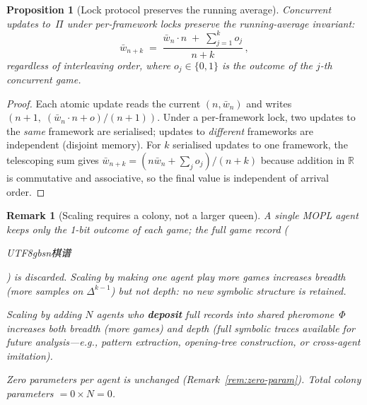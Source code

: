 \documentclass[11pt,a4paper]{article}
\newtheorem{proposition}[theorem]{Proposition}
\newtheorem{remark}[theorem]{Remark}
\newcommand{\R}{\mathbb{R}}
\begin{document}
\begin{proposition}[Lock protocol preserves the running average]%
\label{prop:lock}
Concurrent updates to~$\Pi$ under per-framework locks
preserve the running-average invariant:
\[
  \bar{w}_{n+k}
  \;=\;
  \frac{\bar{w}_n \cdot n \;+\; \sum_{j=1}^{k} o_j}{n+k}\,,
\]
regardless of interleaving order,
where $o_j \in \{0,1\}$ is the outcome of the $j$-th
concurrent game.
\end{proposition}

\begin{proof}
Each atomic update reads the current $(n, \bar{w}_n)$
and writes $(n{+}1,\; (\bar{w}_n \cdot n + o)/(n{+}1))$.
Under a per-framework lock, two updates to the
\emph{same} framework are serialised;
updates to \emph{different} frameworks are independent
(disjoint memory).
For $k$ serialised updates to one framework,
the telescoping sum gives
$\bar{w}_{n+k} = (n\bar{w}_n + \sum_j o_j)/(n{+}k)$
because addition in $\R$ is commutative and associative,
so the final value is independent of arrival order.
\end{proof}

\begin{remark}[Scaling requires a colony, not a larger queen]%
\label{rem:colony-scaling}
\color{black!60}%
A single MOPL agent keeps only the 1-bit outcome of each game;
the full game record
(\begin{CJK}{UTF8}{gbsn}棋谱\end{CJK})
is discarded.
Scaling by making one agent play more games increases
\emph{breadth} (more samples on $\Delta^{k-1}$)
but not \emph{depth}:
no new symbolic structure is retained.

Scaling by adding $N$ agents who \textbf{deposit} full records
into shared pheromone~$\Phi$ increases both breadth
(more games) \emph{and} depth
(full symbolic traces available for future analysis---e.g.,
pattern extraction, opening-tree construction,
or cross-agent imitation).

Zero parameters per agent is unchanged
(Remark~\ref{rem:zero-param}).
Total colony parameters $= 0 \times N = 0$.
\end{remark}
\end{document}
